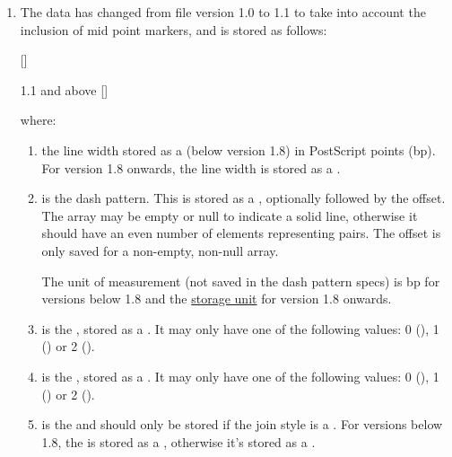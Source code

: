 \begin{numbered}
\begin{enumerate}
  \item\label{jdr:linestyle}
  The  data has changed from file version 1.0 to 1.1 to
  take into account the inclusion of mid point markers,
  and is stored as follows:
  \begin{syntaxline}
  \begin{jdrversion}{1.0}
      []   
  \end{jdrversion}
  \begin{jdrversion}{1.1 and above}
      []    
  \end{jdrversion}
  \end{syntaxline}
  where:
    \begin{enumerate}
    \item {} the line width stored as a 
    (below version 1.8) in PostScript points (\gls*{bp}). For version
    1.8 onwards, the line width is stored as a .

    \item {} is the dash pattern. This is stored as
    a , optionally followed by the  offset.
    The array may be empty or null to indicate a solid line, otherwise
    it should have an even number of elements representing
      pairs. The offset is only saved for a
    non-empty, non-null array.

    The unit of measurement (not saved in
    the dash pattern specs) is \gls{bp} for versions below 1.8 and the
    \hyperref[jdr:storageunit]{storage unit} for version 1.8 onwards.

    \item {} is the , stored as a . It may
    only have one of the following values: 0
    (), 1 () or 2
    ().

    \item {} is the , stored as a .
    It may only have one of the following values: 0
    (), 1 ()
    or 2 ().

    \item {} is the 
    and should only be stored if the join style is a
    . For versions below 1.8, 
    the  is stored as a , otherwise
    it's stored as a .


\end{enumerate}
\end{enumerate}
\end{numbered}

